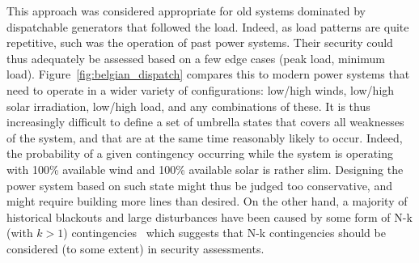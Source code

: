 This approach was considered appropriate for old systems dominated by dispatchable generators that followed the load. Indeed, as load patterns are quite repetitive, such was the operation of past power systems. Their security could thus adequately be assessed based on a few edge cases (peak load, minimum load). Figure~\ref{fig:belgian_dispatch} compares this to modern power systems that need to operate in a wider variety of configurations: low/high winds, low/high solar irradiation, low/high load, and any combinations of these. It is thus increasingly difficult to define a set of umbrella states that covers all weaknesses of the system, and that are at the same time reasonably likely to occur. Indeed, the probability of a given contingency occurring while the system is operating with 100\% available wind and 100\% available solar is rather slim. Designing the power system based on such state might thus be judged too conservative, and might require building more lines than desired. On the other hand, a majority of historical blackouts and large disturbances have been caused by some form of N-k (with \(k > 1\)) contingencies~\cite{majorBlackouts, CascadingMethodoAndChallenges} which suggests that N-k contingencies should be considered (to some extent) in security assessments.

